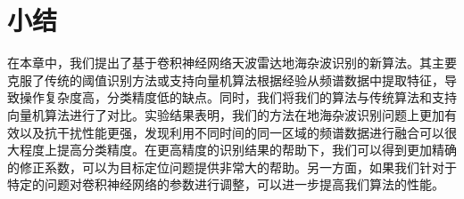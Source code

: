 \section{小结}
在本章中，我们提出了基于卷积神经网络天波雷达地海杂波识别的新算法。其主要克服了传统的阈值识别方法或支持向量机算法根据经验从频谱数据中提取特征，导致操作复杂度高，分类精度低的缺点。同时，我们将我们的算法与传统算法和支持向量机算法进行了对比。实验结果表明，我们的方法在地海杂波识别问题上更加有效以及抗干扰性能更强，发现利用不同时间的同一区域的频谱数据进行融合可以很大程度上提高分类精度。在更高精度的识别结果的帮助下，我们可以得到更加精确的修正系数，可以为目标定位问题提供非常大的帮助。另一方面，如果我们针对于特定的问题对卷积神经网络的参数进行调整，可以进一步提高我们算法的性能。



